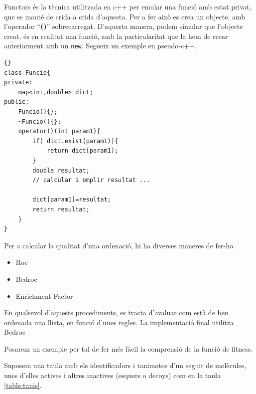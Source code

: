 Functors és la tècnica utilitzada en c++ per emular una funció amb estat privat,
que es manté de crida a crida d'aquesta.  Per a fer això es crea un objecte, amb
l'operador ``\textbf{()}'' sobrecarregat.  D'aquesta manera, podem simular que l'objecte
creat, és en realitat una funció, amb la particularitat que la hem de crear
anteriorment amb un \texttt{new}.  Segueix un exemple en pseudo-c++.


\lstset{language=c++,
	tabsize=2}
\lstset{commentstyle=\textit}

\begin{lstlisting}[frame=trbl]{}
class Funcio{
private:
	map<int,double> dict;
public:
	Funcio(){};
	~Funcio(){};
	operator()(int param1){
		if( dict.exist(param1)){
			return dict[param1];
		}
		double resultat;
		// calcular i omplir resultat ...

		dict[param1]=resultat;
		return resultat;
	}
}
\end{lstlisting}


Per a calcular la qualitat d'una ordenació, hi ha diverses maneres de fer-ho.

\begin{itemize}
	\item Roc
	\item Bedroc
	\item Enrichment Factor
\end{itemize}


En qualsevol d'aquests procediments, es tracta d'avaluar com està de
ben ordenada una llista, en funció d'unes regles.  La implementació
final utilitza Bedroc

Posarem un exemple per tal de fer més fàcil la comprensió de la funció de
fitness.

Suposem una taula amb els identificadors i tanimotos d'un seguit de
molècules, unes d'elles actives i altres inactives (esquers o decoys)
com en la taula \ref{table:tanis}.



